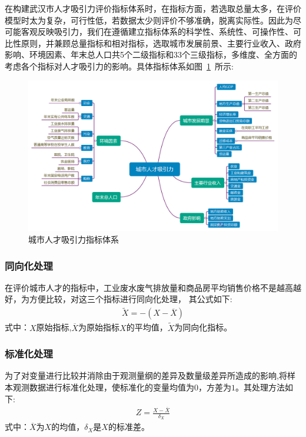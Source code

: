 \documentclass{whutmod}
\begin{document}
		在构建武汉市人才吸引力评价指标体系时，在指标方面，若选取总量太多，在评价模型时太为复杂，可行性低，若数据太少则评价不够准确，脱离实际性。因此为尽可能客观反映吸引力，我们在遵循建立指标体系的科学性、系统性、可操作性、可比性原则\parencite{lepawsky2010metropolis}，并兼顾总量指标和相对指标，选取城市发展前景、主要行业收入、政府影响、环境因素、年末总人口共5个二级指标和33个三级指标，多维度、全方面的考虑各个指标对人才吸引力的影响。具体指标体系如图~\ref{lct}~所示: 	
		\begin{figure}[H]
			\centering
			\includegraphics[width=\textwidth]{figures/clt.png}
			\caption{城市人才吸引力指标体系}\label{lct}
		\end{figure}  
		
		\subsubsection{同向化处理}

		在评价城市人才的指标中，工业废水废气排放量和商品房平均销售价格不是越高越好，为方便比较，对这三个指标进行同向化处理\parencite{张瑞红2012河南省产业集群环境人才吸引力评价研究}， 其公式如下:
		\begin{gather}
		\widetilde{X}=-(X-\overline{X})
		\end{gather}
		式中：$X$原始指标,$\overline{X}$为原始指标$X$的平均值，$\widetilde{X}$为同向化指标。
		
		\subsubsection{标准化处理}
		为了对变量进行比较并消除由于观测量纲的差异及数量级差异所造成的影响,将样本观测数据进行标准化处理，使标准化的变量均值为$0$，方差为$1$。其处理方法如下:
		\begin{gather}
		Z=\frac{X-\overline{X}}{\delta_{X}}
		\end{gather}
		式中：$\overline{X}$为$X$的均值，$\delta_{X}$是$X$的标准差。
		
\end{document}
